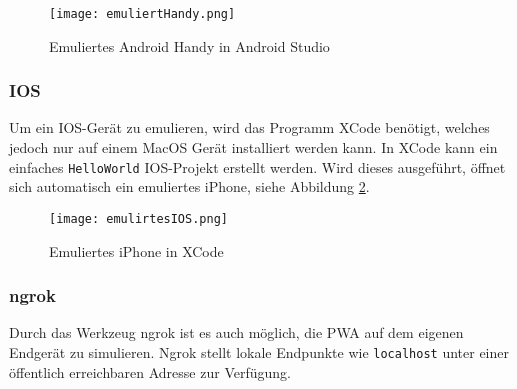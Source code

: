 \begin{figure}[!htb]
    \centering
    \texttt{[image: emuliertHandy.png]}
    \caption {Emuliertes Android Handy in Android Studio}
    \label{Android1}
\end{figure}

\subsubsection{IOS}

Um ein IOS-Gerät zu emulieren, wird das Programm XCode benötigt, welches jedoch nur auf einem MacOS Gerät installiert werden kann. In XCode kann ein einfaches \texttt{HelloWorld} IOS-Projekt erstellt werden. Wird dieses ausgeführt, öffnet sich automatisch ein emuliertes iPhone, siehe Abbildung \ref{img:emuIOS}.

\begin{figure}
    \centering
    \texttt{[image: emulirtesIOS.png]}
    \caption{Emuliertes iPhone in XCode}
    \label{img:emuIOS}
\end{figure}

\subsubsection{ngrok}
Durch das Werkzeug ngrok ist es auch möglich, die PWA auf dem eigenen Endgerät zu simulieren. Ngrok stellt lokale Endpunkte wie \texttt{localhost} unter einer öffentlich erreichbaren Adresse zur Verfügung.




